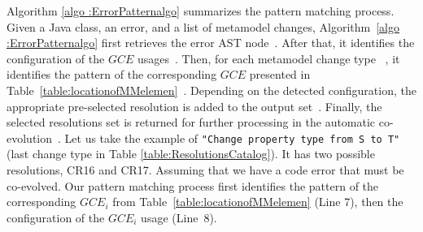 Algorithm \ref{algo :ErrorPatternalgo} summarizes the pattern matching process. 
Given a Java class, an error, and a list of metamodel changes, Algorithm~\ref{algo :ErrorPatternalgo} first retrieves the error AST node~{\small{}}. After that, it identifies the configuration of the $GCE$ usages~{\small{}}. Then, for each metamodel change type ~{\small{}}, it identifies the pattern of the corresponding $GCE$ presented in Table~\ref{table:locationofMMelemen}~{\small{}}. %
Depending on the detected configuration, the appropriate pre-selected resolution is added to the output set~{\small{}}.
Finally, the selected resolutions set is returned for further processing in the automatic co-evolution~{\small{}}. 
Let us take the example of \texttt{"Change property type from S to T"} (last change type in Table \ref{table:ResolutionsCatalog}). It has two possible resolutions, CR16 and CR17. Assuming that we have a code error that must be co-evolved. Our pattern matching process first identifies the pattern of the corresponding $GCE_i$ from Table~\ref{table:locationofMMelemen} (Line 7), then the configuration of the $GCE_i$ usage (Line~8). 


